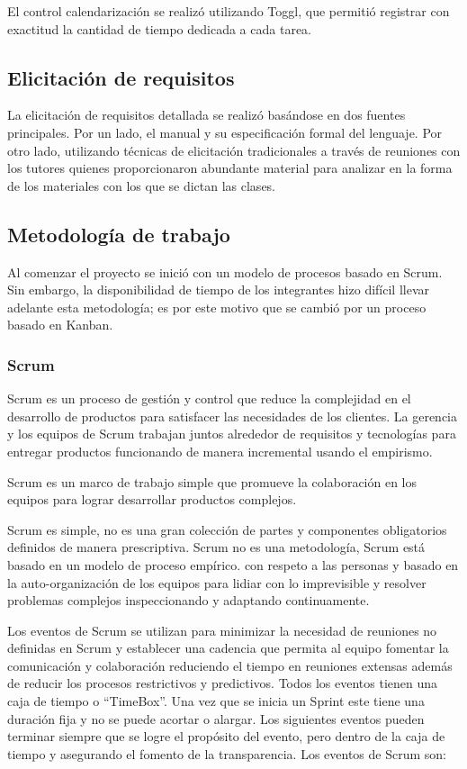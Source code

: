 \documentclass[a4paper,11pt]{article}
\begin{document}
El control calendarización se realizó utilizando Toggl\cite{Toggl}, que permitió registrar con exactitud la cantidad de tiempo dedicada a cada tarea.

\subsection{Elicitación de requisitos}

La elicitación de requisitos detallada se realizó basándose en dos fuentes principales. Por un lado, el manual y su especificación formal del lenguaje. Por otro lado, utilizando técnicas de elicitación tradicionales a través de reuniones con los tutores quienes proporcionaron abundante material para analizar en la forma de los materiales con los que se dictan las clases.

\subsection{Metodología de trabajo}

Al comenzar el proyecto se inició con un modelo de procesos basado en  Scrum\cite{scrum}. Sin embargo, la disponibilidad de tiempo de los integrantes hizo difícil llevar adelante esta metodología; es por este motivo que se cambió por un proceso basado en Kanban\cite{Kanban}.

\subsubsection{Scrum}

Scrum es un proceso de gestión y control que reduce la complejidad en el desarrollo de productos para satisfacer las necesidades de los clientes. La gerencia y los equipos de Scrum trabajan juntos alrededor de requisitos y tecnologías para entregar productos funcionando de manera incremental usando el empirismo.

Scrum es un marco de trabajo simple que promueve la colaboración en los equipos para lograr desarrollar productos complejos.

Scrum es simple, no es una gran colección de partes y componentes obligatorios definidos de manera prescriptiva. Scrum no es una metodología, Scrum está basado en un modelo de proceso empírico. con respeto a las personas y basado en la auto-organización de los equipos para lidiar con lo imprevisible y resolver problemas complejos inspeccionando y adaptando continuamente.

Los eventos de Scrum se utilizan para minimizar la necesidad de reuniones no definidas en Scrum y establecer una cadencia que permita al equipo fomentar la comunicación y colaboración reduciendo el tiempo en reuniones extensas además de reducir los procesos restrictivos y predictivos. Todos los eventos tienen una caja de tiempo o “TimeBox”. Una vez que se inicia un Sprint este tiene una duración fija y no se puede acortar o alargar. Los siguientes eventos pueden terminar siempre que se logre el propósito del evento, pero dentro de la caja de tiempo y asegurando el fomento de la transparencia. Los eventos de Scrum son:
\end{document}
